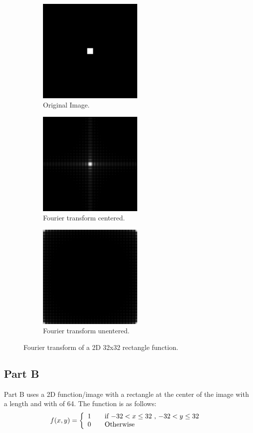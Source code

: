 \documentclass[letter]{article}
\begin{document}
\begin{figure}[hbtp]
  \centering
  \begin{subfigure}{5.1cm}
    \includegraphics[width=5.1cm]{images/rect_512_32x32.png}
    \caption{Original Image.}
  \end{subfigure}
  \begin{subfigure}{5.1cm}
    \includegraphics[width=5.1cm]{images/rect_512_32x32_FU_centered.png}
    \caption{Fourier transform centered.}
  \end{subfigure}
  \begin{subfigure}{5.1cm}
    \includegraphics[width=5.1cm]{images/rect_512_32x32_FU.png}
    \caption{Fourier transform unentered.}
  \end{subfigure}
  \caption{Fourier transform of a 2D 32x32 rectangle function.}
  \label{fig:ft_3232}
\end{figure}
\subsection{Part B}
Part B uses a 2D function/image with a rectangle at the center of the image with a length and with of 64. The function is as follows: $$f(x,y) = \left \{ \begin{array}{l l} 1 & \quad \text{if $-32 < x \leq 32$ , $-32 < y \leq 32$}\\ 0 & \quad \text{Otherwise}\end{array} \right.$$
\end{document}

